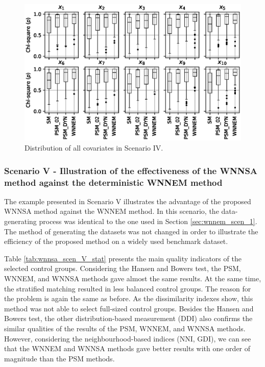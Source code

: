 		\begin{figure}[h!]
			\centering
                \captionsetup{justification=centering}
			\includegraphics[width=\textwidth]{assets/figures/control_group_selection/wnnsa/scenIV/distribution.eps}
			\caption{Distribution of all covariates in Scenario IV. %
			}
			\label{fig:wnnsa_scen_IV_distribution}    
		\end{figure}
								
								
		\subsubsection{Scenario V - Illustration of the effectiveness of the WNNSA method against the deterministic WNNEM method}
		\label{sec:wnnsa_scen_V}
								
		The example presented in Scenario V illustrates the advantage of the proposed WNNSA method against the WNNEM method. In this scenario, the data-generating process was identical to the one used in Section \ref{sec:wnnem_scen_1}. The method of generating the datasets was not changed in order to illustrate the efficiency of the proposed method on a widely used benchmark dataset.
								
		Table \ref{tab:wnnsa_scen_V_stat} presents the main quality indicators of the selected control groups. Considering the Hansen and Bowers test, the PSM, WNNEM, and WNNSA methods gave almost the same results. At the same time, the stratified matching resulted in less balanced control groups. The reason for the problem is again the same as before. As the dissimilarity indexes show, this method was not able to select full-sized control groups. Besides the Hansen and Bowers test, the other distribution-based measurement (DDI) also confirms the similar qualities of the results of the PSM, WNNEM, and WNNSA methods. However, considering the neighbourhood-based indices (NNI, GDI), we can see that the WNNEM and WNNSA methods gave better results with one order of magnitude than the PSM methods.
								
